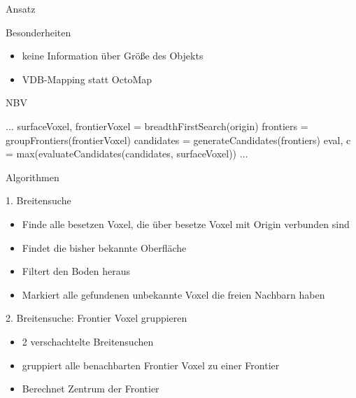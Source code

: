 \documentclass{beamer}
\begin{document}
\begin{frame}{Ansatz}
	\begin{block}{Besonderheiten}
		\begin{itemize}
			\item keine Information über Größe des Objekts
			\item VDB-Mapping statt OctoMap
		\end{itemize}
	\end{block}
	\begin{exampleblock}{}
		\vspace{-0.5cm}
		\begin{algorithm}[H]
			\caption{NBV}
			\begin{algorithmic}[1]
				\State $\dots$
				\State surfaceVoxel, frontierVoxel =  breadthFirstSearch(origin)
				\State frontiers = groupFrontiers(frontierVoxel)
				\State candidates = generateCandidates(frontiers)
				\State eval, c = max(evaluateCandidates(candidates, surfaceVoxel))
				\State $\dots$
				\EndWhile
			\end{algorithmic}
		\end{algorithm}
	\end{exampleblock}

\end{frame}


\begin{frame}{Algorithmen}

	\begin{block}{1. Breitensuche}
		\begin{itemize}
			\item Finde alle besetzen Voxel, die über besetze Voxel mit Origin verbunden sind
			\item Findet die bisher bekannte Oberfläche
			\item Filtert den Boden heraus
			\item Markiert alle gefundenen unbekannte Voxel die freien Nachbarn haben
		\end{itemize}
	\end{block}
	\begin{exampleblock}{2. Breitensuche: Frontier Voxel gruppieren}
		\begin{itemize}
			\item 2 verschachtelte Breitensuchen
			\item gruppiert alle benachbarten Frontier Voxel zu einer Frontier
			\item Berechnet Zentrum der Frontier
		\end{itemize}
	\end{exampleblock}
\end{frame}
\end{document}
